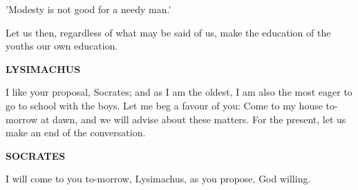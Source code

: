 \documentclass[11pt,letter]{book}
\begin{document}
\par  'Modesty is not good for a needy man.'

\par  Let us then, regardless of what may be said of us, make the education of the youths our own education.

\par \textbf{LYSIMACHUS}
\par   I like your proposal, Socrates; and as I am the oldest, I am also the most eager to go to school with the boys. Let me beg a favour of you:  Come to my house to-morrow at dawn, and we will advise about these matters. For the present, let us make an end of the conversation.

\par \textbf{SOCRATES}
\par   I will come to you to-morrow, Lysimachus, as you propose, God willing.

\par 
 
\end{document}
